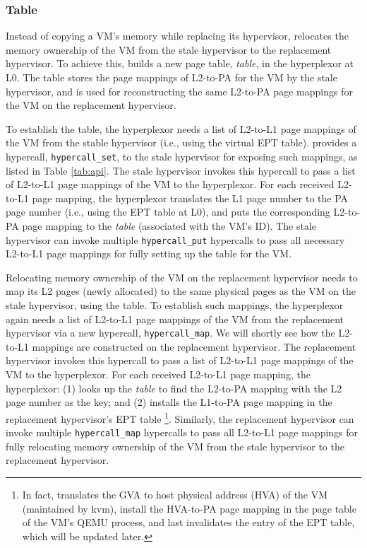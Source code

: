 \subsubsection{\arch Table}
Instead of copying a VM's memory while replacing its hypervisor, \arch relocates the memory ownership of the VM from the stale hypervisor to the replacement hypervisor. To achieve this, \arch builds a new page table, {\em \arch table}, in the hyperplexor at L0. The \arch table stores the page mappings of L2-to-PA for the VM by the stale hypervisor, and is used for reconstructing the same L2-to-PA page mappings for the VM on the replacement hypervisor.

To establish the \arch table, the hyperplexor needs a list of L2-to-L1 page mappings of the VM from the stable hypervisor (i.e., using the virtual EPT table). \arch provides a hypercall, \texttt{hypercall\_set}, to the stale hypervisor for exposing such mappings, as listed in Table \ref{tab:api}. The stale hypervisor invokes this hypercall to pass a list of L2-to-L1 page mappings of the VM to the hyperplexor. For each received L2-to-L1 page mapping, the hyperplexor translates the L1 page number to the PA page number (i.e., using the EPT table at L0), and puts the corresponding L2-to-PA page mapping to the {\em \arch table} (associated with the VM's ID). The stale hypervisor can invoke multiple \texttt{hypercall\_put} hypercalls to pass all necessary L2-to-L1 page mappings for fully setting up the \arch table for the VM.

Relocating memory ownership of the VM on the replacement hypervisor needs to map its L2 pages (newly allocated) to the same physical pages as the VM on the stale hypervisor, using the \arch table. To establish such mappings, the hyperplexor again needs a list of L2-to-L1 page mappings of the VM from the replacement hypervisor via a new hypercall, \texttt{hypercall\_map}. We will shortly see how the L2-to-L1 mappings are constructed on the replacement hypervisor. The replacement hypervisor invokes this hypercall to pass a list of L2-to-L1 page mappings of the VM to the hyperplexor. For each received L2-to-L1 page mapping, the hyperplexor: (1) looks up the {\em \arch table} to find the L2-to-PA mapping with the L2 page number as the key; and (2) installs the L1-to-PA page mapping in the replacement hypervisor's EPT table \footnote{In fact, \arch translates the GVA to host physical address (HVA) of the VM (maintained by kvm), install the HVA-to-PA page mapping in the page table of the VM's QEMU process, and last invalidates the entry of the EPT table, which will be updated later.}. Similarly, the replacement hypervisor can invoke multiple \texttt{hypercall\_map} hypercalls to pass all L2-to-L1 page mappings for fully relocating memory ownership of the VM from the stale hypervisor to the replacement hypervisor. 

